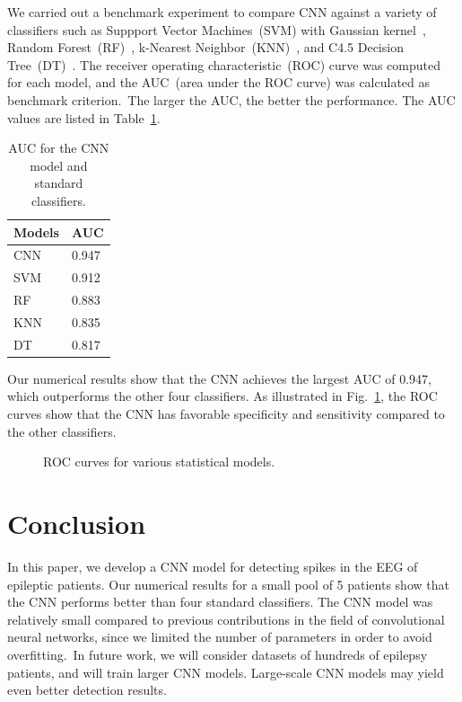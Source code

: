 \documentclass{article}
\begin{document}
We carried out a benchmark experiment to compare CNN against a variety of classifiers such as Suppport Vector Machines~(SVM) with Gaussian kernel~\cite{hearst1998support}, Random Forest~(RF)~\cite{svetnik2003random}, k-Nearest Neighbor~(KNN)~\cite{peterson2009k}, and C4.5 Decision Tree~(DT)~\cite{quinlan1986induction}.
The receiver operating characteristic~(ROC) curve was computed for each model, and the AUC~(area under the ROC curve) was calculated as benchmark criterion.~The larger the AUC, the better the performance. The AUC values are listed in Table~\ref{tab:AUC}.

\begin{table}[htb]
    \centering

    \begin{tabular}{|l|l|}
    \hline
    Models & AUC    \\ \hline
    CNN    & 0.947 \\
    SVM    & 0.912 \\
    RF     & 0.883 \\
    KNN    & 0.835 \\
    DT     & 0.817 \\ \hline
    \end{tabular}

    \caption{AUC for the CNN model and standard classifiers.}
    \label{tab:AUC}

\end{table}

Our numerical results show that the CNN achieves the largest AUC of 0.947, which outperforms the other four classifiers. As illustrated in Fig.~\ref{fig:ROC}, the ROC curves show that the CNN has favorable specificity and sensitivity compared to the other classifiers.

\begin{figure}[htb]
    \centering
    \setlength\fboxsep{0pt}
    \setlength{}
    \caption{ROC curves for various statistical models.}
    \label{fig:ROC}
\end{figure}

\section{Conclusion}

In this paper, we develop a CNN model for detecting spikes in the EEG of epileptic patients.
Our numerical results for a small pool of 5 patients show that the CNN performs better than four standard classifiers.
The CNN model was relatively small compared to previous contributions in the field of convolutional neural networks, since we limited the number of parameters in order to avoid overfitting.~In future work, we will consider datasets of hundreds of epilepsy patients, and will train larger CNN models. Large-scale CNN models may yield even better detection results.



\end{document}
